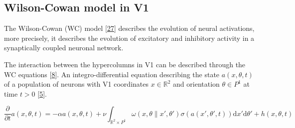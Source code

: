 \documentclass[
  american,
]{article}
\begin{document}
\hypertarget{wilson-cowan-model-in-v1}{%
\subsection{Wilson-Cowan model in V1}\label{wilson-cowan-model-in-v1}}

The Wilson-Cowan (WC) model {[}\protect\hyperlink{ref-wilson1972}{27}{]} describes the evolution of neural activations,
more precisely, it describes the evolution of excitatory and inhibitory activity in
a synaptically coupled neuronal network.

The interaction between the hypercolumns in V1 can be described through
the WC equations {[}\protect\hyperlink{ref-bressloff2002}{8}{]}.
An integro-differential equation describing the state \(a(x,\theta,t)\) of a population
of neurons with V1 coordinates \(x\in\mathbb{R}^2\) and orientation \(\theta\in P^1\) at time \(t>0\) {[}\protect\hyperlink{ref-bertalmio2018}{5}{]}.

\begin{equation}
\frac{\partial}{\partial t}a(x,\theta,t) = -\alpha a(x,\theta,t) + \nu
\int_{\mathbb{R}^2\times P^1} \omega(x,\theta\| x',\theta') \sigma(a(x',\theta',t)) \mathrm{d}x'\mathrm{d}\theta'
+ h(x,\theta,t)
\end{equation}
\end{document}
